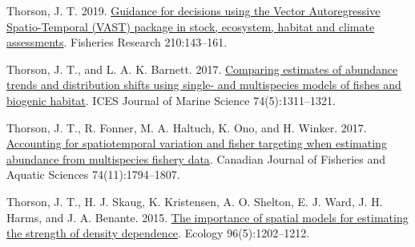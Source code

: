 \documentclass[
]{article}
\newlength{\cslhangindent}
\newlength{\cslentryspacingunit} %
\newenvironment{CSLReferences}[2] %
 {%
  \setlength{\parindent}{0pt}
  \ifodd #1
  \let\oldpar\par
  \def\par{\hangindent=\cslhangindent\oldpar}
  \fi
  \setlength{\parskip}{#2\cslentryspacingunit}
 }%
 {}
\begin{document}
\hypertarget{refs}{}
\begin{CSLReferences}{1}{0}
\leavevmode{}%
Thorson, J. T. 2019. \href{https://doi.org/10.1016/j.fishres.2018.10.013}{Guidance for decisions using the {Vector} {Autoregressive} {Spatio}-{Temporal} ({VAST}) package in stock, ecosystem, habitat and climate assessments}. Fisheries Research 210:143--161.

\leavevmode{}%
Thorson, J. T., and L. A. K. Barnett. 2017. \href{https://doi.org/10.1093/icesjms/fsw193}{Comparing estimates of abundance trends and distribution shifts using single- and multispecies models of fishes and biogenic habitat}. ICES Journal of Marine Science 74(5):1311--1321.

\leavevmode{}%
Thorson, J. T., R. Fonner, M. A. Haltuch, K. Ono, and H. Winker. 2017. \href{https://doi.org/10.1139/cjfas-2015-0598}{Accounting for spatiotemporal variation and fisher targeting when estimating abundance from multispecies fishery data}. Canadian Journal of Fisheries and Aquatic Sciences 74(11):1794--1807.

\leavevmode{}%
Thorson, J. T., H. J. Skaug, K. Kristensen, A. O. Shelton, E. J. Ward, J. H. Harms, and J. A. Benante. 2015. \href{https://doi.org/10.1890/14-0739.1}{The importance of spatial models for estimating the strength of density dependence}. Ecology 96(5):1202--1212.

\end{CSLReferences}
\end{document}
